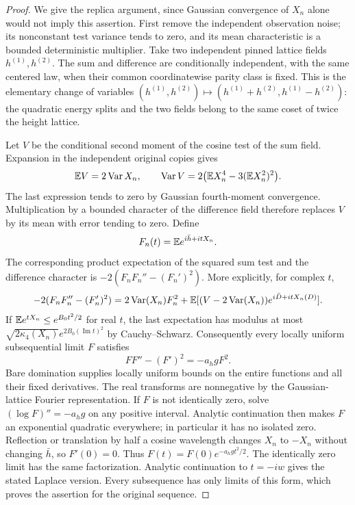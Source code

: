 \begin{proof}
We give the replica argument, since Gaussian convergence of $X_n$
alone would not imply this assertion.  First remove the independent
observation noise; its nonconstant test variance tends to zero,
and its mean characteristic is a bounded deterministic multiplier.
Take two independent pinned lattice fields $h^{(1)},h^{(2)}$.
The sum and difference are conditionally independent, with the
same centered law, when their common coordinatewise parity class
is fixed.  This is the elementary change of variables
$(h^{(1)},h^{(2)})\mapsto(h^{(1)}+h^{(2)},h^{(1)}-h^{(2)})$:
the quadratic energy splits and the two fields belong to the same
coset of twice the height lattice.

Let $V$ be the conditional second moment of the cosine test of the
sum field.  Expansion in the independent original copies gives
\[
 \mathbb E V=2\operatorname{Var} X_n,\qquad
 \operatorname{Var} V=2\bigl(\mathbb E X_n^4-3(\mathbb E X_n^2)^2\bigr).
\]
The last expression tends to zero by Gaussian fourth-moment
convergence.  Multiplication by a bounded character of the
difference field therefore replaces $V$ by its mean with error
tending to zero.  Define
\[
 F_n(t)=\mathbb E e^{i\bar h+itX_n}.
\]
The corresponding product expectation of the squared sum test and
the difference character is
$-2(F_n F_n''-(F_n')^2)$.  More explicitly, for complex $t$,
\[
 -2(F_nF_n''-(F_n')^2)
 =2\operatorname{Var}(X_n)F_n^2+
 \mathbb E[(V-2\operatorname{Var}(X_n))
      e^{i\bar D+itX_n(D)}].
\]
If $\mathbb E e^{tX_n}\le e^{B_0t^2/2}$ for real $t$, the
last expectation has modulus at most
$\sqrt{2\kappa_4(X_n)}e^{2B_0(\operatorname{Im}t)^2}$
by Cauchy--Schwarz.  Consequently every locally uniform
subsequential limit $F$ satisfies
\begin{equation}\label{ep:replica-ode}
 FF''-(F')^2=-a_hg F^2 .
\end{equation}
Bare domination supplies locally uniform bounds on the entire
functions and all their fixed derivatives.  The real transforms
are nonnegative by the Gaussian-lattice Fourier representation.
If $F$ is not identically zero, solve
$(\log F)''=-a_hg$ on any positive interval.  Analytic continuation
then makes $F$ an exponential quadratic everywhere; in particular
it has no isolated zero.  Reflection or translation by half a
cosine wavelength changes $X_n$ to $-X_n$ without changing
$\bar h$, so $F'(0)=0$.  Thus
$F(t)=F(0)e^{-a_hgt^2/2}$.  The identically zero limit has the same
factorization.  Analytic continuation to $t=-iw$ gives the stated
Laplace version.  Every subsequence has only limits of this form,
which proves the assertion for the original sequence.
\end{proof}

